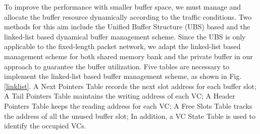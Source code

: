 \documentclass[10pt,conference]{IEEEtran}
\begin{document}
To improve the performance with smaller buffer space, we must manage and allocate the buffer resource dynamically according to the traffic conditions. Two methods for this aim include the Unified Buffer Structure (UBS) based \cite{NPKV06}\cite{5770788} and the linked-list based \cite{4555894}\cite{Neishaburi:2009:RAN:1531542.1531658} dynamical buffer management scheme. Since the UBS is only applicable to the fixed-length packet network, we adapt the linked-list based management scheme for both shared memory bank and the private buffer in our approach to guarantee the buffer utilization. Five tables are necessary to implement the linked-list based buffer management scheme, as shown in Fig. \ref{linklist}. A Next Pointers Table records the next slot address for each buffer slot; A Tail Pointers Table maintains the writing address of each VC; A Header Pointers Table keeps the reading address for each VC; A Free Slots Table tracks the address of all the unused buffer slot; In addition, a VC State Table is used to identify the occupied VCs.

\end{document}
